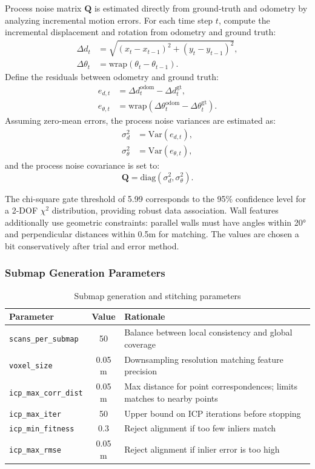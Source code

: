 \documentclass[11pt]{article}
\begin{document}
Process noise matrix $\mathbf{Q}$ is estimated directly from ground‑truth and odometry by analyzing incremental motion errors. For each time step $t$, compute the incremental displacement and rotation from odometry and ground truth:
\begin{align}
	\Delta d_t &= \sqrt{(x_t - x_{t-1})^2 + (y_t - y_{t-1})^2}, \\
	\Delta \theta_t &= \mathrm{wrap}(\theta_t - \theta_{t-1}).
\end{align}
Define the residuals between odometry and ground truth:
\begin{align}
	e_{d,t} &= \Delta d_t^{\text{odom}} - \Delta d_t^{\text{gt}}, \\
	e_{\theta,t} &= \mathrm{wrap}\!\left(\Delta \theta_t^{\text{odom}} - \Delta \theta_t^{\text{gt}}\right).
\end{align}
Assuming zero‑mean errors, the process noise variances are estimated as:
\begin{align}
	\sigma_d^2 &= \mathrm{Var}(e_{d,t}), \\
	\sigma_\theta^2 &= \mathrm{Var}(e_{\theta,t}),
\end{align}
and the process noise covariance is set to:
\begin{equation}
	\mathbf{Q} = \mathrm{diag}(\sigma_d^2, \sigma_\theta^2).
\end{equation}


The chi-square gate threshold of 5.99 corresponds to the 95\% confidence level for a 2-DOF $\chi^2$ distribution, providing robust data association. Wall features additionally use geometric constraints: parallel walls must have angles within 20° and perpendicular distances within 0.5m for matching. The values are chosen a bit conservatively after trial and error method.

\subsubsection{Submap Generation Parameters}

\begin{table}[htbp]
	\centering
	\caption{Submap generation and stitching parameters}
	\label{tab:submap_params}
	\begin{tabular}{lcp{8cm}}
		\toprule
		\textbf{Parameter} & \textbf{Value} & \textbf{Rationale} \\
		\midrule
		\texttt{scans\_per\_submap} & 50 & Balance between local consistency and global coverage \\
		\texttt{voxel\_size} & 0.05 m & Downsampling resolution matching feature precision \\
		\texttt{icp\_max\_corr\_dist} & 0.05 m & Max distance for point correspondences; limits matches to nearby points \\
		\texttt{icp\_max\_iter} & 50 & Upper bound on ICP iterations before stopping \\
		\texttt{icp\_min\_fitness} & 0.3 & Reject alignment if too few inliers match \\
		\texttt{icp\_max\_rmse} & 0.05 m & Reject alignment if inlier error is too high \\		
		\bottomrule
	\end{tabular}
\end{table}
\end{document}
